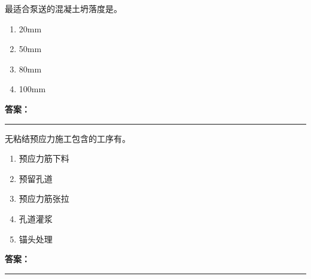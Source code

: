 \documentclass[UTF8,fontset=fandol,11pt]{ctexart}
\newcommand{\answerline}{\textcolor{answerred}{\rule{2.4cm}{0.7pt}}}
\begin{document}
\vspace{0.2em}

\begin{quizbox}[title={乱序第 125 题｜第四章混凝土结构工程}]

最适合泵送的混凝土坍落度是。\\

\begin{enumerate}[label=\Alph*.]

\item 20mm

\item 50mm

\item 80mm

\item 100mm

\end{enumerate}

\textbf{\textcolor{answerred}{答案：}} \answerline

\end{quizbox}

\vspace{0.2em}

\begin{quizbox}[title={乱序第 126 题｜第五章预应力混凝土工程}]

无粘结预应力施工包含的工序有。\\

\begin{enumerate}[label=\Alph*.]

\item 预应力筋下料

\item 预留孔道

\item 预应力筋张拉

\item 孔道灌浆

\item 锚头处理

\end{enumerate}

\textbf{\textcolor{answerred}{答案：}} \answerline

\end{quizbox}

\vspace{0.2em}
\end{document}
